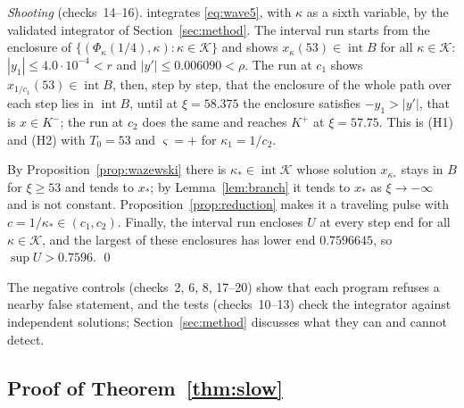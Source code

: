 \documentclass[11pt]{article}
\theoremstyle{definition}
\newcommand{\Kset}{\mathcal{K}}
\newcommand{\xs}{x_*}
\begin{document}
\emph{Shooting} (checks~14--16).  integrates \eqref{eq:wave5}, with $\kappa$ as a sixth variable, by the validated integrator of Section~\ref{sec:method}. The interval run starts from the enclosure of $\{(\Phi_\kappa(1/4), \kappa) : \kappa \in \Kset\}$ and shows $x_\kappa(53) \in \operatorname{int} B$ for all $\kappa \in \Kset$: $|y_1| \le 4.0\cdot 10^{-4} < r$ and $|y'| \le 0.006090 < \rho$. The run at $c_1$ shows $x_{1/c_1}(53) \in \operatorname{int} B$, then, step by step, that the enclosure of the whole path over each step lies in $\operatorname{int} B$, until at $\xi = 58.375$ the enclosure satisfies $-y_1 > |y'|$, that is $x \in K^-$; the run at $c_2$ does the same and reaches $K^+$ at $\xi = 57.75$. This is (H1) and (H2) with $T_0 = 53$ and $\varsigma = +$ for $\kappa_1 = 1/c_2$.

By Proposition~\ref{prop:wazewski} there is $\kappa_* \in \operatorname{int}\Kset$ whose solution $x_{\kappa_*}$ stays in $B$ for $\xi \ge 53$ and tends to $\xs$; by Lemma~\ref{lem:branch} it tends to $\xs$ as $\xi \to -\infty$ and is not constant. Proposition~\ref{prop:reduction} makes it a traveling pulse with $c = 1/\kappa_* \in (c_1, c_2)$. Finally, the interval run encloses $U$ at every step end for all $\kappa \in \Kset$, and the largest of these enclosures has lower end $0.7596645$, so $\sup U > 0.7596$. \qed

The negative controls (checks~2, 6, 8, 17--20) show that each program refuses a nearby false statement, and the tests (checks~10--13) check the integrator against independent solutions; Section~\ref{sec:method} discusses what they can and cannot detect.

\subsection{Proof of Theorem~\ref{thm:slow}}\label{sec:proof-slow}
\end{document}
